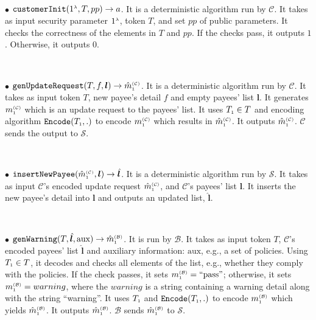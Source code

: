 \begin{definition}
\

\item[$\bullet$] $\mathtt{customerInit} (1^{\scriptscriptstyle \lambda}, T, pp)\rightarrow a$. It is a deterministic  algorithm run by  $\mathcal{C}$. It takes as input security parameter $1^{\scriptscriptstyle \lambda}$,  token $T$, and  set $pp$ of public parameters. It checks the correctness of the elements in $T$ and $pp$. If the checks pass, it outputs $1$. Otherwise, it outputs $0$. 

\

\item [$\bullet$] $\mathtt{genUpdateRequest}(T, f, {\bm l})\rightarrow \hat m^{\scriptscriptstyle\mathcal{(C)}}_{\scriptscriptstyle 1}$.  It is a deterministic algorithm run by $\mathcal{C}$.  It takes as input token $T$,  new payee's detail $f$ and empty payees' list $ {\bm l}$. It  generates $m^{\scriptscriptstyle\mathcal{(C)}}_{\scriptscriptstyle 1}$ which is an  update request to the payees' list. It uses $T_{\scriptscriptstyle 1}\in T$ and encoding algorithm $\mathtt{Encode}(T_{\scriptscriptstyle 1}, .)$ to encode $m^{\scriptscriptstyle\mathcal{(C)}}_{\scriptscriptstyle 1}$ which results in $\hat {m}^{\scriptscriptstyle\mathcal{(C)}}_{\scriptscriptstyle 1}$. It outputs $\hat  m^{\scriptscriptstyle\mathcal{(C)}}_{\scriptscriptstyle 1}$. $\mathcal{C}$ sends the output to $\mathcal{S}$.
%

\

\item [$\bullet$] $\mathtt{insertNewPayee}(\hat{m}^{\scriptscriptstyle\mathcal{(C)}}_{\scriptscriptstyle 1}, {\bm l})\rightarrow  \hat{\bm l}$. It is a deterministic algorithm run by $\mathcal{S}$. It takes as input $\mathcal{C}$'s encoded update request  $\hat{m}^{\scriptscriptstyle\mathcal{(C)}}_{\scriptscriptstyle 1}$, and $\mathcal{C}$'s payees' list ${\bm l}$. It inserts the new payee's detail into ${\bm l}$ and outputs an updated list, $\hat{\bm l}$.
%

\

\item  [$\bullet$] $\mathtt{genWarning}(T, \hat{\bm l}, \text{aux})\rightarrow \hat m^{\scriptscriptstyle\mathcal{(B)}}_{\scriptscriptstyle1}$. It is run by $\mathcal{B}$. It takes as input token $T$, $\mathcal{C}$'s encoded   payees' list $ \hat{\bm l}$ and auxiliary information: $\text{aux}$, e.g., a set of policies. Using $T_{\scriptscriptstyle 1}\in T$, it decodes and checks  all elements of the list, e.g., whether they comply with the policies. If the check  passes,  it sets $m^{\scriptscriptstyle\mathcal{(B)}}_{\scriptscriptstyle1}=\text{``pass''}$; otherwise, it sets $m^{\scriptscriptstyle\mathcal{(B)}}_{\scriptscriptstyle1}={warning}$, where the $warning$ is a string  containing a warning detail along with
the string ``warning''. It uses  $T_{\scriptscriptstyle 1}$ and $\mathtt{Encode}(T_{\scriptscriptstyle 1}, .)$ to encode $m^{\scriptscriptstyle\mathcal{(B)}}_{\scriptscriptstyle1}$ which yields $\hat m^{\scriptscriptstyle\mathcal{(B)}}_{\scriptscriptstyle1}$. It outputs  $\hat m^{\scriptscriptstyle\mathcal{(B)}}_{\scriptscriptstyle1}$.  $\mathcal{B}$ sends $\hat m^{\scriptscriptstyle\mathcal{(B)}}_{\scriptscriptstyle1}$ to $\mathcal{S}$.
%


\end{definition}
